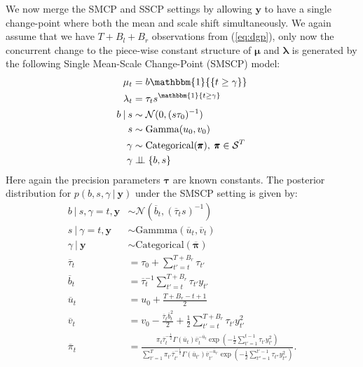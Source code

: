 We now merge the SMCP and SSCP settings by allowing $\mathbf{y}$ to have a single change-point where both the mean and scale shift simultaneously. We again assume that we have $T+B_l+B_r$ observations from (\ref{eq:dgp}), only now the concurrent change to the piece-wise constant structure of $\pmb{\mu}$ and $\pmb{\lambda}$ is generated by the following Single Mean-Scale Change-Point (SMSCP) model:
\begin{align}
    \label{eq:smscp-start}
    \mu_{t} &= b \mathbbm{1}{\{t \geq \gamma\}} \\
    \lambda_t &= \tau_t s^{\mathbbm{1}\{t\geq \gamma\}} \\
    b \:|\: s &\sim \mathcal{N}(0,(s \tau_0)^{-1}) \\
    s &\sim \text{Gamma}(u_0, v_0) \\
    \gamma &\sim \text{Categorical}(\pmb{\pi}),\;\pmb{\pi}\in \mathcal{S}^T \\
    \gamma &\indep \{b,s\} 
    \label{eq:smscp-end}
\end{align}
Here again the precision parameters $\pmb{\tau}$ are known constants. The posterior distribution for $p(b, s, \gamma \:|\: \mathbf{y})$ under the SMSCP setting is given by:
\begin{align}
    b \:|\: s, \gamma = t, \mathbf{y} &\sim \mathcal{N}(\overline{b}_t, (\overline{\tau}_t s)^{-1}) \label{eq:b-smscp} \\
    s \:|\: \gamma = t, \mathbf{y} &\sim \text{Gammma}(\overline{u}_t, \overline{v}_t) \\
    \gamma \:|\: \mathbf{y} &\sim \text{Categorical}(\overline{\pmb{\pi}}) \\
    \overline{\tau}_t &= \tau_0 + \sum_{t' = t}^{T+B_r} \tau_{t'} \label{eq:gamma-smscp} \\
    \overline{b}_t &= \overline{\tau}^{-1}_t \sum_{t'=t}^{T+B_r} \tau_{t'} y_{t'} \\
    \overline{u}_t &= u_0 + \frac{T +B_r- t + 1}{2} \\
    \overline{v}_t &= v_0 - \frac{\overline{\tau}_t\overline{b}^2_t}{2} + \frac{1}{2} \sum_{t'=t}^{T+B_r} \tau_{t'}y_{t'}^2 \\
    \overline{\pi}_t &= \frac{\pi_t\overline{\tau}_t^{-\frac{1}{2}} \Gamma(\overline{u}_t) \overline{v}_t^{-\overline{u}_t}\exp\left(- \frac{1}{2}\sum_{t'=1}^{t-1} \tau_{t'}y^2_{t'}\right)}{\sum_{t'=1}^T\pi_{t'}\overline{\tau}_{t'}^{-\frac{1}{2}} \Gamma(\overline{u}_{t'}) \overline{v}_{t'}^{-\overline{u}_{t'}}\exp\left(- \frac{1}{2}\sum_{t''=1}^{t'-1} \tau_{t''}y^2_{t''}\right)}.
\end{align}

